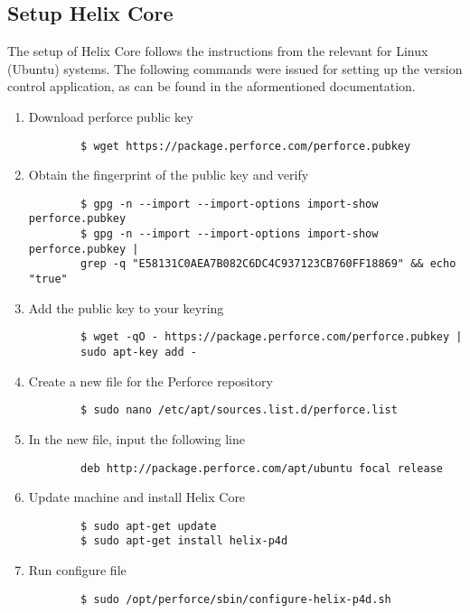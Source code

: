 \subsection{Setup Helix Core}
The setup of Helix Core follows the instructions from the 
\href{https://help.perforce.com/helix-core/quickstart/Content/quickstart/admin-install-linux.html}{\color{blue}{Helix Core Server Administrator Guide}}
relevant for Linux (Ubuntu) systems. The following commands were issued for setting up the version control application, as 
can be found in the aformentioned documentation.
\begin{enumerate}
    \item Download perforce public key
    \begin{verbatim}
        $ wget https://package.perforce.com/perforce.pubkey
    \end{verbatim}
    \item Obtain the fingerprint of the public key and verify
    \begin{verbatim}
        $ gpg -n --import --import-options import-show perforce.pubkey
        $ gpg -n --import --import-options import-show perforce.pubkey | 
        grep -q "E58131C0AEA7B082C6DC4C937123CB760FF18869" && echo "true"
    \end{verbatim}
    \item Add the public key to your keyring
    \begin{verbatim}
        $ wget -qO - https://package.perforce.com/perforce.pubkey | 
        sudo apt-key add -
    \end{verbatim}
    \item Create a new file for the Perforce repository
    \begin{verbatim}
        $ sudo nano /etc/apt/sources.list.d/perforce.list
    \end{verbatim}
    \item In the new file, input the following line
    \begin{verbatim}
        deb http://package.perforce.com/apt/ubuntu focal release
    \end{verbatim}
    \item Update machine and install Helix Core
    \begin{verbatim}
        $ sudo apt-get update
        $ sudo apt-get install helix-p4d
    \end{verbatim}
    \item Run configure file
    \begin{verbatim}
        $ sudo /opt/perforce/sbin/configure-helix-p4d.sh

\end{verbatim}
\end{enumerate}
